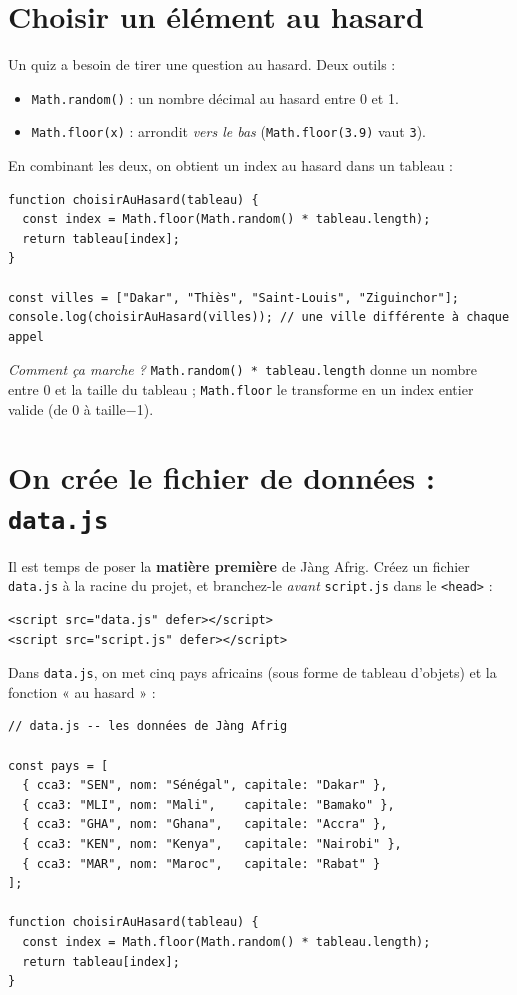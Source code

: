 \documentclass[11pt,a4paper]{article}
\newcommand{\code}[1]{\texttt{#1}}
\begin{document}
\section{Choisir un élément au hasard}

Un quiz a besoin de tirer une question au hasard. Deux outils :
\begin{itemize}[leftmargin=*,noitemsep]
  \item \code{Math.random()} : un nombre décimal au hasard entre 0 et 1.
  \item \code{Math.floor(x)} : arrondit \emph{vers le bas} (\code{Math.floor(3.9)} vaut \code{3}).
\end{itemize}

En combinant les deux, on obtient un index au hasard dans un tableau :

\begin{lstlisting}[style=js]
function choisirAuHasard(tableau) {
  const index = Math.floor(Math.random() * tableau.length);
  return tableau[index];
}

const villes = ["Dakar", "Thiès", "Saint-Louis", "Ziguinchor"];
console.log(choisirAuHasard(villes)); // une ville différente à chaque appel
\end{lstlisting}

\emph{Comment ça marche ?} \code{Math.random() * tableau.length} donne un nombre entre 0 et la taille du tableau ; \code{Math.floor} le transforme en un index entier valide (de 0 à taille$-$1).

\section{On crée le fichier de données : \texttt{data.js}}

Il est temps de poser la \textbf{matière première} de Jàng Afrig. Créez un fichier \code{data.js} à la racine du projet, et branchez-le \emph{avant} \code{script.js} dans le \code{<head>} :

\begin{lstlisting}[style=html]
<script src="data.js" defer></script>
<script src="script.js" defer></script>
\end{lstlisting}

Dans \code{data.js}, on met cinq pays africains (sous forme de tableau d'objets) et la fonction « au hasard » :

\begin{lstlisting}[style=js]
// data.js -- les données de Jàng Afrig

const pays = [
  { cca3: "SEN", nom: "Sénégal", capitale: "Dakar" },
  { cca3: "MLI", nom: "Mali",    capitale: "Bamako" },
  { cca3: "GHA", nom: "Ghana",   capitale: "Accra" },
  { cca3: "KEN", nom: "Kenya",   capitale: "Nairobi" },
  { cca3: "MAR", nom: "Maroc",   capitale: "Rabat" }
];

function choisirAuHasard(tableau) {
  const index = Math.floor(Math.random() * tableau.length);
  return tableau[index];
}
\end{lstlisting}
\end{document}
